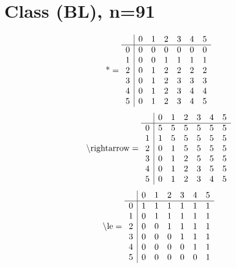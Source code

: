 \documentclass[11pt]{article}
\begin{document}
\section{Class (BL), n=91}
\[\text{*} = 
\begin{array}{r | r r r r r r}
 & 0 & 1 & 2 & 3 & 4 & 5 \\ \hline
0 & 0 & 0 & 0 & 0 & 0 & 0 \\
1 & 0 & 0 & 1 & 1 & 1 & 1 \\
2 & 0 & 1 & 2 & 2 & 2 & 2 \\
3 & 0 & 1 & 2 & 3 & 3 & 3 \\
4 & 0 & 1 & 2 & 3 & 4 & 4 \\
5 & 0 & 1 & 2 & 3 & 4 & 5 \\
\end{array}
\]
\[\text{\textbackslash rightarrow} = 
\begin{array}{r | r r r r r r}
 & 0 & 1 & 2 & 3 & 4 & 5 \\ \hline
0 & 5 & 5 & 5 & 5 & 5 & 5 \\
1 & 1 & 5 & 5 & 5 & 5 & 5 \\
2 & 0 & 1 & 5 & 5 & 5 & 5 \\
3 & 0 & 1 & 2 & 5 & 5 & 5 \\
4 & 0 & 1 & 2 & 3 & 5 & 5 \\
5 & 0 & 1 & 2 & 3 & 4 & 5 \\
\end{array}
\]
\[\text{\textbackslash le} = 
\begin{array}{r | r r r r r r}
 & 0 & 1 & 2 & 3 & 4 & 5 \\ \hline
0 & 1 & 1 & 1 & 1 & 1 & 1 \\
1 & 0 & 1 & 1 & 1 & 1 & 1 \\
2 & 0 & 0 & 1 & 1 & 1 & 1 \\
3 & 0 & 0 & 0 & 1 & 1 & 1 \\
4 & 0 & 0 & 0 & 0 & 1 & 1 \\
5 & 0 & 0 & 0 & 0 & 0 & 1 \\
\end{array}
\]
\end{document}
